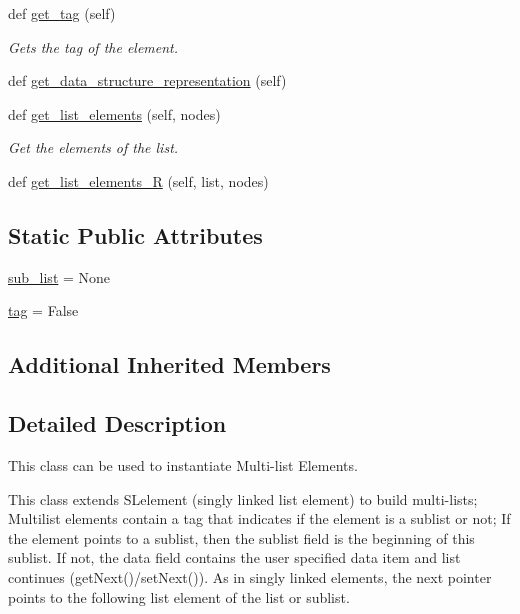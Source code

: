 \begin{DoxyCompactItemize}
def \hyperlink{classbridges_1_1ml__element_1_1_m_lelement_afd872697e67a92dc4f4ef2f7bd7d249d}{get\+\_\+tag} (self)
\begin{DoxyCompactList}\small\item\em Gets the tag of the element. \end{DoxyCompactList}\item 
def \hyperlink{classbridges_1_1ml__element_1_1_m_lelement_a7d176b966746a889f9234d4a76b99c0c}{get\+\_\+data\+\_\+structure\+\_\+representation} (self)
\item 
def \hyperlink{classbridges_1_1ml__element_1_1_m_lelement_a3996cd2cec7c3978437392eba2ef66eb}{get\+\_\+list\+\_\+elements} (self, nodes)
\begin{DoxyCompactList}\small\item\em Get the elements of the list. \end{DoxyCompactList}\item 
def \hyperlink{classbridges_1_1ml__element_1_1_m_lelement_a951795a932cf17381d1d90515e3fc985}{get\+\_\+list\+\_\+elements\+\_\+\+R} (self, list, nodes)
\end{DoxyCompactItemize}
\subsection*{Static Public Attributes}
\begin{DoxyCompactItemize}
\item 
\hyperlink{classbridges_1_1ml__element_1_1_m_lelement_ad8c56ba876dc2331e63bb1cff279375a}{sub\+\_\+list} = None
\item 
\hyperlink{classbridges_1_1ml__element_1_1_m_lelement_aebde8498e7a70f6d94bb639cfac1f9c6}{tag} = False
\end{DoxyCompactItemize}
\subsection*{Additional Inherited Members}


\subsection{Detailed Description}
This class can be used to instantiate Multi-\/list Elements. 

This class extends S\+Lelement (singly linked list element) to build multi-\/lists; Multilist elements contain a tag that indicates if the element is a sublist or not; If the element points to a sublist, then the sublist field is the beginning of this sublist. If not, the data field contains the user specified data item and list continues (get\+Next()/set\+Next()). As in singly linked elements, the next pointer points to the following list element of the list or sublist.

